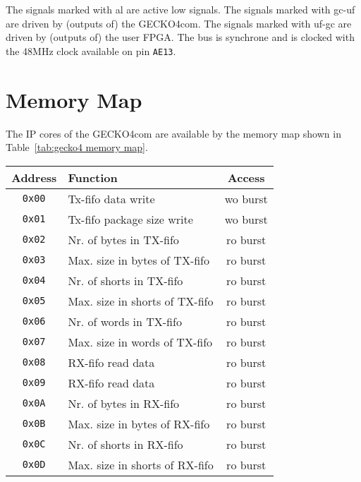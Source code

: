 The signals
marked with {\sc al} are active low signals. The signals marked with {\sc gc-uf}
are driven by (outputs of) the {\sc GECKO4com}. The signals marked with {\sc
uf-gc} are driven by (outputs of) the user FPGA.
The bus is synchrone and is clocked with the 48MHz clock available on pin
\verb+AE13+.
\section{Memory Map}
\label{sec:mem map}
The IP cores of the {\sc GECKO4com} are available by the memory map shown in
Table~\ref{tab:gecko4 memory map}.
\begin{table}[hp]
\begin{tabular}{|c|l|c|}
\hline
\textbf{Address}&\textbf{Function}&\textbf{Access}\\
\hline
\hline
\verb+0x00+&Tx-fifo data write&{\sc wo} {\sc burst}\\
\hline
\verb+0x01+&Tx-fifo package size write&{\sc wo} {\sc burst}\\
\hline
\verb+0x02+&Nr. of bytes in TX-fifo&{\sc ro} {\sc burst}\\
\hline
\verb+0x03+&Max. size in bytes of TX-fifo&{\sc ro} {\sc burst}\\
\hline
\verb+0x04+&Nr. of shorts in TX-fifo&{\sc ro} {\sc burst}\\
\hline
\verb+0x05+&Max. size in shorts of TX-fifo&{\sc ro} {\sc burst}\\
\hline
\verb+0x06+&Nr. of words in TX-fifo&{\sc ro} {\sc burst}\\
\hline
\verb+0x07+&Max. size in words of TX-fifo&{\sc ro} {\sc burst}\\
\hline
\verb+0x08+&RX-fifo read data&{\sc ro} {\sc burst}\\
\hline
\verb+0x09+&RX-fifo read data&{\sc ro} {\sc burst}\\
\hline
\verb+0x0A+&Nr. of bytes in RX-fifo&{\sc ro} {\sc burst}\\
\hline
\verb+0x0B+&Max. size in bytes of RX-fifo&{\sc ro} {\sc burst}\\
\hline
\verb+0x0C+&Nr. of shorts in RX-fifo&{\sc ro} {\sc burst}\\
\hline
\verb+0x0D+&Max. size in shorts of RX-fifo&{\sc ro} {\sc burst}\\
\hline

\end{tabular}
\end{table}
